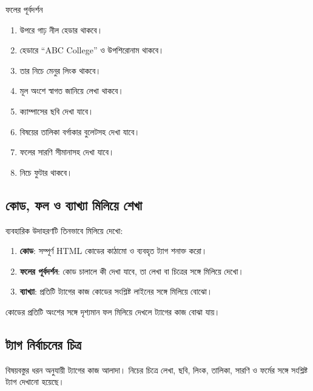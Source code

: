 \begin{examplebox}{ফলের পূর্বদর্শন}
\begin{enumerate}
\item উপরে গাঢ় নীল হেডার থাকবে।
\item হেডারে ``ABC College'' ও উপশিরোনাম থাকবে।
\item তার নিচে মেনুর লিংক থাকবে।
\item মূল অংশে স্বাগত জানিয়ে লেখা থাকবে।
\item ক্যাম্পাসের ছবি দেখা যাবে।
\item বিষয়ের তালিকা বর্গাকার বুলেটসহ দেখা যাবে।
\item ফলের সারণি সীমানাসহ দেখা যাবে।
\item নিচে ফুটার থাকবে।
\end{enumerate}
\end{examplebox}

\subsection{কোড, ফল ও ব্যাখ্যা মিলিয়ে শেখা}

ব্যবহারিক উদাহরণটি তিনভাবে মিলিয়ে দেখো:

\begin{enumerate}
\item \textbf{কোড}: সম্পূর্ণ HTML কোডের কাঠামো ও ব্যবহৃত ট্যাগ শনাক্ত করো।
\item \textbf{ফলের পূর্বদর্শন}: কোড চালালে কী দেখা যাবে, তা লেখা বা চিত্রের সঙ্গে মিলিয়ে দেখো।
\item \textbf{ব্যাখ্যা}: প্রতিটি ট্যাগের কাজ কোডের সংশ্লিষ্ট লাইনের সঙ্গে মিলিয়ে বোঝো।
\end{enumerate}

কোডের প্রতিটি অংশের সঙ্গে দৃশ্যমান ফল মিলিয়ে দেখলে ট্যাগের কাজ বোঝা যায়।

\subsection{ট্যাগ নির্বাচনের চিত্র}

বিষয়বস্তুর ধরন অনুযায়ী ট্যাগের কাজ আলাদা। নিচের চিত্রে লেখা, ছবি, লিংক, তালিকা, সারণি ও ফর্মের সঙ্গে সংশ্লিষ্ট ট্যাগ দেখানো হয়েছে।

